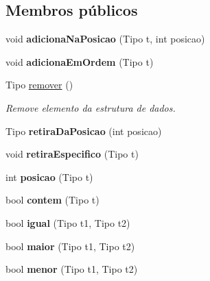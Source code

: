 \subsection*{Membros públicos}
\begin{DoxyCompactItemize}
\item 
\hypertarget{classLista_a21853f382bab3540ab6dfeece9fe3ba1}{void {\bfseries adiciona\-Na\-Posicao} (Tipo t, int posicao)}\label{classLista_a21853f382bab3540ab6dfeece9fe3ba1}

\item 
\hypertarget{classLista_a9c9a9ac8cbf7e849b2e470c3be5926a2}{void {\bfseries adiciona\-Em\-Ordem} (Tipo t)}\label{classLista_a9c9a9ac8cbf7e849b2e470c3be5926a2}

\item 
Tipo \hyperlink{classLista_a58768c31b7137a2303212b63e9804dc6}{remover} ()
\begin{DoxyCompactList}\small\item\em Remove elemento da estrutura de dados. \end{DoxyCompactList}\item 
\hypertarget{classLista_a554cfbab02c678a9186ffb3d80079e97}{Tipo {\bfseries retira\-Da\-Posicao} (int posicao)}\label{classLista_a554cfbab02c678a9186ffb3d80079e97}

\item 
\hypertarget{classLista_a29b4ed24294d84af7e6287374338f868}{void {\bfseries retira\-Especifico} (Tipo t)}\label{classLista_a29b4ed24294d84af7e6287374338f868}

\item 
\hypertarget{classLista_ad374d77a408c513004c79cd33ddc76a3}{int {\bfseries posicao} (Tipo t)}\label{classLista_ad374d77a408c513004c79cd33ddc76a3}

\item 
\hypertarget{classLista_a3dcad88a266c9d487e149c366f7e8d05}{bool {\bfseries contem} (Tipo t)}\label{classLista_a3dcad88a266c9d487e149c366f7e8d05}

\item 
\hypertarget{classLista_a2ffbcb916698dba55a97290ff91be666}{bool {\bfseries igual} (Tipo t1, Tipo t2)}\label{classLista_a2ffbcb916698dba55a97290ff91be666}

\item 
\hypertarget{classLista_a9b265cf31415874bd52170d3ae4abe29}{bool {\bfseries maior} (Tipo t1, Tipo t2)}\label{classLista_a9b265cf31415874bd52170d3ae4abe29}

\item 
\hypertarget{classLista_a4b879b1914f3bf9bc76570a50749aafc}{bool {\bfseries menor} (Tipo t1, Tipo t2)}\label{classLista_a4b879b1914f3bf9bc76570a50749aafc}

\end{DoxyCompactItemize}
